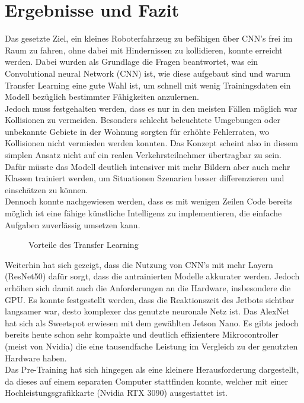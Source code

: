 \section{Ergebnisse und Fazit} \label{sec:ergebnisse}

Das gesetzte Ziel, ein kleines Roboterfahrzeug zu befähigen über CNN's frei im Raum zu fahren, ohne dabei mit Hindernissen zu kollidieren, konnte erreicht werden. Dabei wurden als Grundlage die Fragen beantwortet, was ein Convolutional neural Network (CNN) ist, wie diese aufgebaut sind und warum Transfer Learning eine gute Wahl ist, um schnell mit wenig Trainingsdaten ein Modell bezüglich bestimmter Fähigkeiten anzulernen.\\
Jedoch muss festgehalten werden, dass es nur in den meisten Fällen möglich war Kollisionen zu vermeiden. Besonders schlecht beleuchtete Umgebungen oder unbekannte Gebiete in der Wohnung sorgten für erhöhte Fehlerraten, wo Kollisionen nicht vermieden werden konnten. Das Konzept scheint also in diesem simplen Ansatz nicht auf ein realen Verkehrsteilnehmer übertragbar zu sein. Dafür müsste das Modell deutlich intensiver mit mehr Bildern aber auch mehr Klassen trainiert werden, um Situationen \bzw Szenarien besser differenzieren und einschätzen zu können.\\
Dennoch konnte nachgewiesen werden, dass es mit wenigen Zeilen Code bereits möglich ist eine fähige künstliche Intelligenz zu implementieren, die einfache Aufgaben zuverlässig umsetzen kann.

\begin{figure}
    \centering
    \caption[Vorteile des Transfer Learning]{Vorteile des Transfer Learning \cite{Brownlee2017}}
    \label{fig:Bild5.1}
\end{figure}

Weiterhin hat sich gezeigt, dass die Nutzung von CNN's mit mehr Layern (\zB ResNet50) dafür sorgt, dass die antrainierten Modelle akkurater werden. Jedoch erhöhen sich damit auch die Anforderungen an die Hardware, insbesondere die GPU. Es konnte festgestellt werden, dass die Reaktionszeit des Jetbots sichtbar langsamer war, desto komplexer das genutzte neuronale Netz ist. Das AlexNet hat sich als Sweetspot erwiesen mit dem gewählten Jetson Nano. Es gibts jedoch bereits heute schon sehr kompakte und deutlich effizientere Mikrocontroller (meist von Nvidia) die eine tausendfache Leistung im Vergleich zu der genutzten Hardware haben. \\
Das Pre-Training hat sich hingegen als eine kleinere Herausforderung dargestellt, da dieses auf einem separaten Computer stattfinden konnte, welcher mit einer Hochleistungsgrafikkarte (Nvidia RTX 3090) ausgestattet ist.